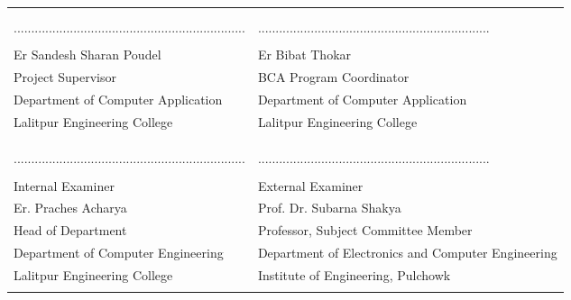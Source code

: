 \begin{center}
    {\fontsize{14pt}{18}\selectfont
    \begin{table}[ht]
        \begin{tabularx}{\textwidth}{|Y|Y|}
        \hline
        &\\
        &\\
        ..................................................................&..................................................................\\
        &\\
        Er Sandesh Sharan Poudel & Er Bibat Thokar \\
        Project Supervisor & BCA Program Coordinator \\
        Department of Computer Application & Department of Computer Application\\
        Lalitpur Engineering College & Lalitpur Engineering College \\
        &\\
        \hline
        &\\
        &\\
        ..................................................................&..................................................................\\
        &\\
        Internal Examiner & External Examiner \\
        Er. Praches Acharya & Prof. Dr. Subarna Shakya \\
        Head of Department & Professor, Subject Committee Member\\
        Department of Computer Engineering & Department of Electronics and Computer Engineering\\
        Lalitpur Engineering College& Institute of Engineering, Pulchowk\\
        &\\
        \hline
        \end{tabularx}
        \end{table}
    }
\end{center}